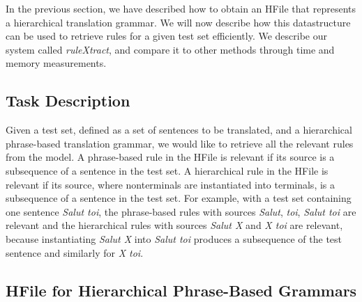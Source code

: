 In the previous section, we have described how to obtain an HFile
that represents a hierarchical translation grammar.
We will now describe how this datastructure can be used to retrieve rules for
a given test set efficiently. We describe our system called
\emph{ruleXtract}, and compare it to other methods through time and memory
measurements.

\subsection{Task Description}

Given a test set, defined as a set of sentences to be translated, and a
hierarchical phrase-based translation grammar, we would
like to retrieve all the relevant rules from the model. A phrase-based rule
in the HFile is
relevant if its source is a subsequence of a sentence in the test set. A
hierarchical rule in the HFile is relevant if
its source, where nonterminals are instantiated into
terminals, is
a subsequence of a sentence in the test set. For example, with a test set
containing one sentence \emph{Salut toi}, the phrase-based rules with sources
\emph{Salut}, \emph{toi}, \emph{Salut toi} are relevant and the hierarchical
rules with sources \emph{Salut X} and \emph{X toi} are relevant, because
instantiating \emph{Salut X} into \emph{Salut toi} produces a subsequence
of the test sentence and similarly for \emph{X toi}.

\subsection{HFile for Hierarchical Phrase-Based Grammars}
\label{sec:hfileForHiero}




